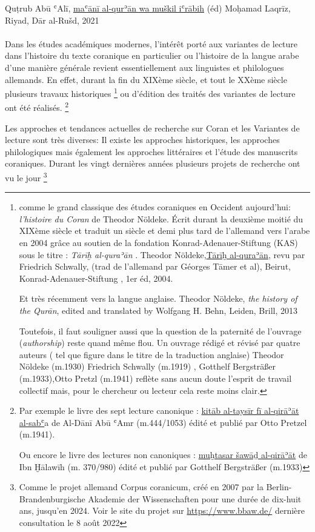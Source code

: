 \documentclass[a4paper,12pt]{report}
\begin{document}
\begin{itemize}
{Quṭrub  Abū  ʿAlī, 
 \underline{maʿānī al-qurʾān wa muškil iʿrābih} (éd) Moḥamad Laqrīz, Riyad, Dār al-Rušd, 2021
} 
\paragraph{}
Dans les études académiques modernes, l'intérêt porté aux variantes de lecture  dans l'histoire du texte coranique en particulier  ou l'histoire de la langue arabe  d'une manière générale revient essentiellement aux linguistes et philologues allemands. En effet, durant la fin du XIXème siècle, et tout le XXème siècle plusieurs travaux historiques \footnote {comme le grand classique des études coraniques en Occident aujourd'hui: \textit{l'histoire du Coran} de Theodor Nöldeke.  Écrit durant la deuxième moitié du XIXème siècle et traduit un siècle et demi plus tard de l'allemand vers l'arabe en 2004 grâce au soutien de la fondation  Konrad-Adenauer-Stiftung (KAS) sous le titre : \textit{Tārīḫ al-quraʾān }.  Theodor Nöldeke,\underline {Tārīḫ al-quraʾān}, revu par Friedrich Schwally, (trad de l’allemand par Géorges Tāmer et al), Beirut, Konrad-Adenauer-Stiftung , 1er éd, 2004.

Et très récemment vers la langue anglaise.
Theodor Nöldeke, \textit{the history of the Qurān}, edited and translated by Wolfgang H. Behn, Leiden, Brill, 2013

Toutefois, il faut souligner aussi que la question de la paternité de l'ouvrage  (\textit{authorship}) reste quand même flou. Un ouvrage rédigé et révisé par quatre auteurs ( tel que figure dans le titre de la traduction anglaise)   Theodor Nöldeke (m.1930) Friedrich Schwally (m.1919) , Gotthelf Bergsträßer (m.1933),Otto Pretzl (m.1941) reflète sans aucun doute l'esprit de travail collectif mais, pour le chercheur ou lecteur cela reste moins clair. } 
ou d'édition des traités des variantes de lecture ont été réalisés. \footnote{ Par exemple le livre des sept lecture canonique :
\underline{ kitāb al-taysīr fī al-qirāʾāt al-sabʿ}a de Al-Dānī Abū  ʿAmr (m.444/1053)  édité et publié par Otto Pretzel (m.1941).

Ou encore le livre des lectures non canoniques : \underline{muḫtasar šaw\=aḏ al-qirāʾāt} de Ibn Ḫālawīh (m. 370/980) édité et publié par Gotthelf Bergsträßer (m.1933) }





Les approches et tendances actuelles de recherche sur Coran et les Variantes de lecture sont très diverses: Il  existe les approches historiques, les approches philologiques mais également les approches littéraires et l'étude des manuscrits coraniques. Durant les vingt  dernières années plusieurs   projets de recherche ont vu le jour \footnote{ Comme le projet allemand  Corpus coranicum,  créé en 2007 par la Berlin-Brandenburgische Akademie der Wissenschaften pour une durée de dix-huit ans, jusqu’en 2024. Voir le site du projet sur  {\url{ https://www.bbaw.de/}  dernière consultation le 8 août 2022} 

}
\end{itemize}
\end{document}
